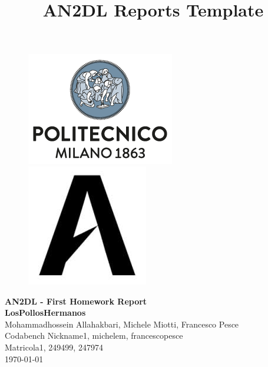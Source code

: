 \documentclass[11pt]{article}
\title{AN2DL Reports Template}
\begin{document}
\begin{figure}[H]
    \raggedright
    \includegraphics[scale=0.4]{polimi.png} \hfill
    \includegraphics[scale=0.3]{airlab.jpeg}
\end{figure}

\vspace{5mm}

\begin{center}
    {\Large \textbf{AN2DL - First Homework Report}}\\
    \vspace{2mm}
    {\Large \textbf{LosPollosHermanos}}\\
    \vspace{2mm}
    {\large Mohammadhossein Allahakbari,}
    {\large Michele Miotti,}
    {\large Francesco Pesce}\\
    \vspace{2mm}
    {Codabench Nickname1,}
    {michelem,}
    {francescopesce}\\
    \vspace{2mm}
    {Matricola1,}
    {249499,}
    {247974}\\
    \vspace{5mm}
    \today
\end{center}
\vspace{5mm}
\end{document}
